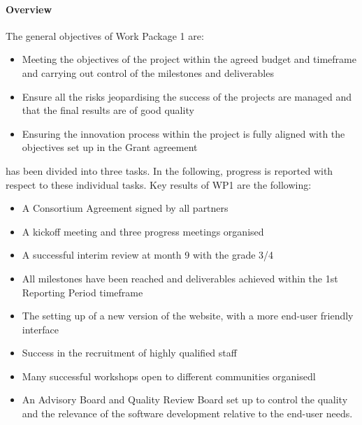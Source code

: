 
\paragraph{Overview}

The general objectives of Work Package 1 are:

\begin{itemize}
\item{Meeting the objectives of the project within the agreed budget and timeframe and carrying out control of the milestones and deliverables}
\item{Ensure all the risks jeopardising the success of the projects are managed and that the final results are of good quality}
\item{Ensuring the innovation process within the project is fully aligned with the objectives set up in the Grant agreement}
\end{itemize}

 has been divided into three tasks. In the following, progress is reported with respect to these individual tasks.
Key results of WP1 are the following:

\begin{itemize}
\item{A Consortium Agreement signed by all partners}
\item{A kickoff meeting and three progress meetings organised}
\item{A successful interim review at month 9 with the grade 3/4}
\item{All milestones have been reached and deliverables achieved within the 1st Reporting Period timeframe}
\item{The setting up of a new version of the \ODK website, with a more end-user friendly interface}
\item{Success in the recruitment of highly qualified staff}
\item{Many successful workshops open to different communities organisedl}
\item{An Advisory Board and Quality Review Board set up to control the quality and the relevance of the software development relative to the end-user needs.}
\end{itemize}

